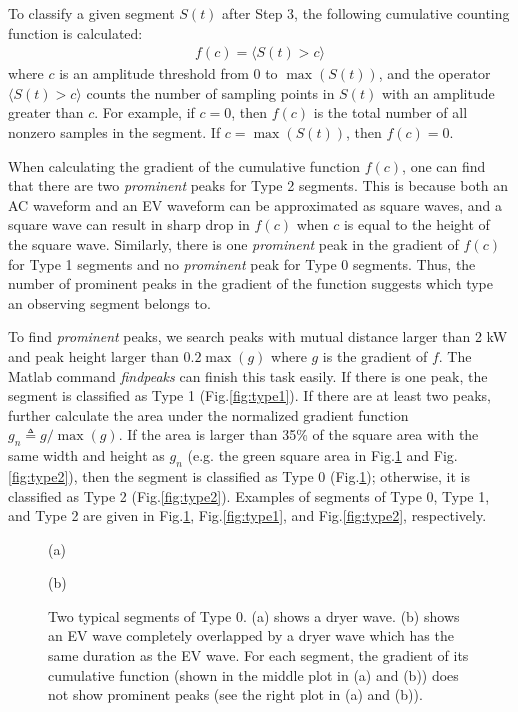 \documentclass[conference]{IEEEtran}
\begin{document}
To classify a given segment $S(t)$ after Step 3, the following cumulative counting function is calculated:
\begin{eqnarray}
f( c ) = \langle  S(t) > c \rangle
\end{eqnarray}
where $c$ is an amplitude threshold from 0 to $\max(S(t))$, and the operator $\langle  S(t) > c \rangle$ counts the number of sampling points in $S(t)$ with an amplitude greater than $c$. For example, if $c=0$, then $f(c)$ is the total number of all nonzero samples in the segment. If $c=\max(S(t))$, then $f(c)=0$.

When calculating the gradient of the cumulative function $f( c )$, one can find that there are two \emph{prominent} peaks for Type 2 segments. This is because both an AC waveform and an EV waveform can be approximated as square waves, and a square wave can result in sharp drop in $f(c)$ when $c$ is equal to the height of the square wave. Similarly, there is one \emph{prominent} peak in the gradient of $f(c)$ for Type 1 segments and no \emph{prominent} peak for Type 0 segments. Thus, the number of prominent peaks in the gradient of the function suggests which type an observing segment belongs to.

To find \emph{prominent} peaks, we search peaks with mutual distance larger than 2 kW and peak height larger than $0.2\max(g)$ where $g$ is the gradient of $f$. The Matlab command \emph{findpeaks} can finish this task easily. If there is one peak, the segment is classified as Type 1 (Fig.\ref{fig:type1}). If there are at least two peaks, further calculate the area under the normalized gradient function $g_n \triangleq g/\max(g)$. If the area is larger than 35\% of the square area with the same width and height as $g_n$ (e.g. the green square area in Fig.\ref{fig:type0} and Fig.\ref{fig:type2}), then the segment is classified as Type 0 (Fig.\ref{fig:type0}); otherwise, it is classified as Type 2 (Fig.\ref{fig:type2}).  Examples of segments of Type 0, Type 1, and Type 2 are given in Fig.\ref{fig:type0}, Fig.\ref{fig:type1}, and Fig.\ref{fig:type2}, respectively.



\begin{figure}[t]
\begin{minipage}[b]{.48\linewidth}
  \centering
  \centerline{}
  \centerline{\footnotesize{(a)}}
\end{minipage}
\hfill
\begin{minipage}[b]{0.48\linewidth}
  \centering
  \centerline{}
  \centerline{\footnotesize{(b)}}
\end{minipage}
\caption{\footnotesize{Two typical segments of Type 0. (a) shows a dryer wave. (b) shows an EV wave completely overlapped by a dryer wave which has the same duration as the EV wave. For each segment, the gradient of its cumulative function (shown in the middle plot in (a) and (b)) does not show prominent peaks (see the right plot in (a) and (b)).}}
\label{fig:type0}
\end{figure}
\end{document}
